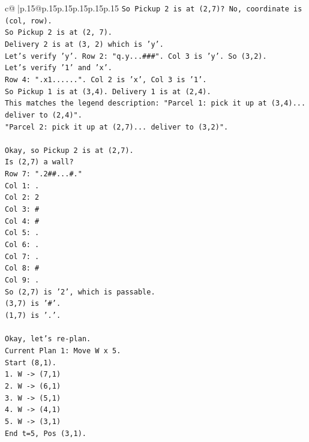 \documentclass{article}
\begin{document}
{\begin{supertabular}{c@{$\;$}|p{.15\linewidth}@{}p{.15\linewidth}p{.15\linewidth}p{.15\linewidth}p{.15\linewidth}p{.15\linewidth}}
{{{\texttt{So Pickup 2 is at (2,7)? No, coordinate is (col, row).} \\
\texttt{So Pickup 2 is at (2, 7).} \\
\texttt{Delivery 2 is at (3, 2) which is 'y'.} \\
\texttt{Let's verify 'y'. Row 2: "q.y...\#\#\#". Col 3 is 'y'. So (3,2).} \\
\texttt{Let's verify '1' and 'x'.} \\
\texttt{Row 4: ".x1......". Col 2 is 'x', Col 3 is '1'.} \\
\texttt{So Pickup 1 is at (3,4). Delivery 1 is at (2,4).} \\
\texttt{This matches the legend description: "Parcel 1: pick it up at (3,4)... deliver to (2,4)".} \\
\texttt{"Parcel 2: pick it up at (2,7)... deliver to (3,2)".} \\
\\ 
\texttt{Okay, so Pickup 2 is at (2,7).} \\
\texttt{Is (2,7) a wall?} \\
\texttt{Row 7: ".2\#\#...\#."} \\
\texttt{Col 1: .} \\
\texttt{Col 2: 2} \\
\texttt{Col 3: \#} \\
\texttt{Col 4: \#} \\
\texttt{Col 5: .} \\
\texttt{Col 6: .} \\
\texttt{Col 7: .} \\
\texttt{Col 8: \#} \\
\texttt{Col 9: .} \\
\texttt{So (2,7) is '2', which is passable.} \\
\texttt{(3,7) is '\#'.} \\
\texttt{(1,7) is '.'.} \\
\\ 
\texttt{Okay, let's re{-}plan.} \\
\texttt{Current Plan 1: Move W x 5.} \\
\texttt{Start (8,1).} \\
\texttt{1. W {-}> (7,1)} \\
\texttt{2. W {-}> (6,1)} \\
\texttt{3. W {-}> (5,1)} \\
\texttt{4. W {-}> (4,1)} \\
\texttt{5. W {-}> (3,1)} \\
\texttt{End t=5, Pos (3,1).} \\
}}}
\end{supertabular}}
\end{document}
